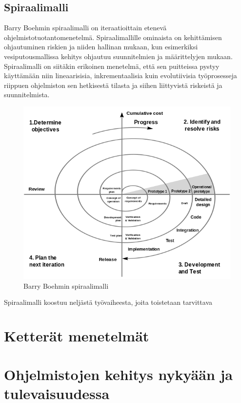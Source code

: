 \documentclass[finnish,12pt]{tktltiki2}
\theoremstyle{definition}
\theoremstyle{remark}
\begin{document}
\subsection{Spiraalimalli}

Barry Boehmin spiraalimalli on iteraatioittain etenevä ohjelmistotuotantomenetelmä. Spiraalimallille ominaista on kehittämisen ohjautuminen riskien ja niiden hallinan mukaan, kun esimerkiksi vesiputousmallissa kehitys ohjautuu suunnitelmien ja määrittelyjen mukaan. Spiraalimalli on siitäkin erikoinen menetelmä, että sen puitteissa pystyy käyttämään niin lineaarisisia, inkrementaalisia kuin evolutiivisia työprosesseja riippuen ohjelmiston sen hetkisestä tilasta ja siihen liittyvistä riskeistä ja suunnitelmista. 

\begin{figure}[ht!]
\centering
{}
\includegraphics[width=150mm]{spiral.png}
\caption{Barry Boehmin spiraalimalli}
\label{overflow}
\end{figure}

Spiraalimalli koostuu neljästä työvaiheesta, joita toistetaan tarvittava



\section{Ketterät menetelmät}
\section{Ohjelmistojen kehitys nykyään ja tulevaisuudessa}
\end{document}
